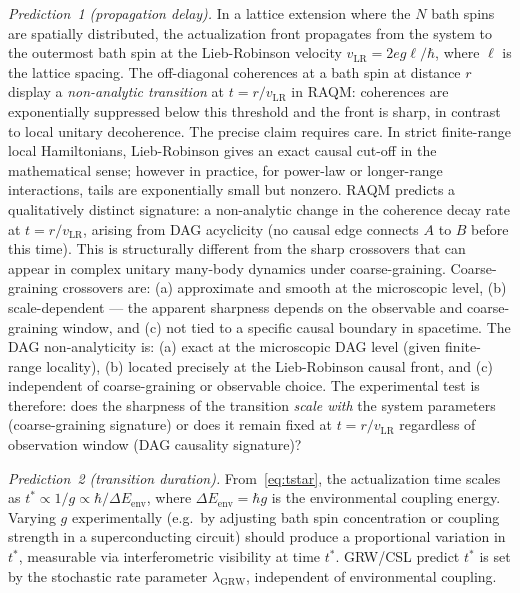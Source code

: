 \documentclass[11pt,a4paper]{article}
\theoremstyle{plain}
\theoremstyle{definition}
\theoremstyle{remark}
\begin{document}
\emph{Prediction~1 (propagation delay).} In a lattice extension where
the $N$ bath spins are spatially distributed, the actualization front
propagates from the system to the outermost bath spin at the Lieb-Robinson
velocity $v_{\mathrm{LR}} = 2eg\ell/\hbar$, where $\ell$ is the lattice
spacing. The off-diagonal coherences at a bath spin at distance $r$ display a
\emph{non-analytic transition} at $t = r/v_{\mathrm{LR}}$ in RAQM:
coherences are exponentially suppressed below this threshold and the
front is sharp, in contrast to local unitary decoherence.
The precise claim requires care. In strict finite-range local Hamiltonians,
Lieb-Robinson gives an exact causal cut-off in the mathematical sense;
however in practice, for power-law or longer-range interactions, tails
are exponentially small but nonzero. RAQM predicts a qualitatively distinct signature: a non-analytic change in
the coherence decay rate at $t = r/v_{\mathrm{LR}}$, arising from DAG
acyclicity (no causal edge connects $A$ to $B$ before this time).
This is structurally different from the sharp crossovers that can appear
in complex unitary many-body dynamics under coarse-graining.
Coarse-graining crossovers are: (a) approximate and smooth at the
microscopic level, (b) scale-dependent --- the apparent sharpness depends
on the observable and coarse-graining window, and (c) not tied to a
specific causal boundary in spacetime. The DAG non-analyticity is:
(a) exact at the microscopic DAG level (given finite-range locality),
(b) located precisely at the Lieb-Robinson causal front, and
(c) independent of coarse-graining or observable choice.
The experimental test is therefore: does the sharpness of the transition
\emph{scale with} the system parameters (coarse-graining signature) or
does it remain fixed at $t = r/v_{\mathrm{LR}}$ regardless of observation
window (DAG causality signature)?

\emph{Prediction~2 (transition duration).} From~\eqref{eq:tstar}, the
actualization time scales as $t^* \propto 1/g \propto \hbar/\Delta E_{\mathrm{env}}$,
where $\Delta E_{\mathrm{env}} = \hbar g$ is the environmental coupling energy.
Varying $g$ experimentally (e.g.\ by adjusting bath spin concentration or
coupling strength in a superconducting circuit) should produce a proportional
variation in $t^*$, measurable via interferometric visibility at time $t^*$.
GRW/CSL predict $t^*$ is set by the stochastic rate parameter $\lambda_{\mathrm{GRW}}$,
independent of environmental coupling.
\end{document}
